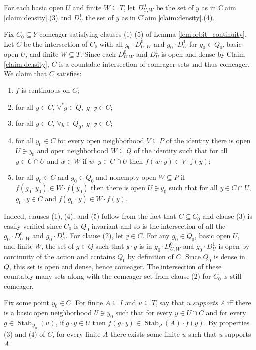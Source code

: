 \documentclass[12pt]{amsart}
\theoremstyle{plain}
\theoremstyle{definition}
\DeclareMathOperator{\Stab}{Stab}
\begin{document}
For each basic open $U$ and finite $W \subseteq T$, let $D^0_{U, W}$ be the set of $y$ as in Claim \ref{claim:density}.(3) and $D^1_{U}$ the set of $y$ as in Claim \ref{claim:density}.(4).

Fix $C_0 \subseteq Y$ comeager satisfying clauses (1)-(5) of Lemma \ref{lem:orbit_continuity}.
Let $C$ be the intersection of $C_0$ with all $g_0 \cdot D^0_{U, W}$ and $g_0 \cdot D^1_{U}$ for $g_0 \in Q_0$, basic open $U$, and finite $W \subseteq T$.
Since each $D^0_{U, W}$ and $D^1_{U}$ is open and dense by Claim \ref{claim:density}, $C$ is a countable intersection of comeager sets and thus comeager.
We claim that $C$ satisfies:
\begin{enumerate}
\item $f$ is continuous on $C$;
\item for all $y \in C$, $\forall^* g \in Q, \; g \cdot y \in C$;
\item for all $y \in C$, $\forall g \in Q_0, \; g \cdot y \in C$;
\item for all $y_0 \in C$ for every open neighborhood $V \subseteq P$ of the identity there is open $U \ni y_0$ and open neighborhood $W \subseteq Q$ of the identity such that for all $y \in C \cap U$ and $w \in W$ if $w \cdot y \in C \cap U$ then $f(w \cdot y) \in V \cdot f(y)$;
\item for all $y_0 \in C$ and $g_0 \in Q_0$ and nonempty open $W \subseteq P$ if $f(g_0 \cdot y_0) \in W \cdot f(y_0)$ then there is open $U \ni y_0$ such that for all $y \in C \cap U$, $g_0 \cdot y \in C$ and $f(g_0 \cdot y) \in W \cdot f(y)$.
\end{enumerate}
Indeed, clauses (1), (4), and (5) follow from the fact that $C \subseteq C_0$ and clause (3) is easily verified since $C_0$ is $Q_0$-invariant and so is the intersection of all the $g_0 \cdot D^0_{U, W}$ and $g_0 \cdot D^1_{U}$.
For clause (2), let $y \in C$. For any $g_0 \in Q_0$, basic open $U$, and finite $W$, the set of $g \in Q$ such that $g \cdot y$ is in $g_0 \cdot D^0_{U, W}$ and $g_0 \cdot D^1_U$ is open by continuity of the action and contains $Q_0$ by definition of $C$. Since $Q_0$ is dense in $Q$, this set is open and dense, hence comeager. The intersection of these countably-many sets along with the comeager set from clause (2) for $C_0$ is still comeager.

Fix some point $y_0 \in C$.
For finite $A \subseteq I$ and $u \subseteq T$, say that $u$ \emph{supports} $A$ iff there is a basic open neighborhood $U \ni y_0$ such that for every $y \in U \cap C$ and for every $g \in \Stab_{Q_0}(u)$, if $g \cdot y \in U$ then $f(g \cdot y) \in \Stab_P(A) \cdot f(y)$.
By properties (3) and (4) of $C$, for every finite $A$ there exists some finite $u$ such that $u$ supports $A$.
\end{document}
